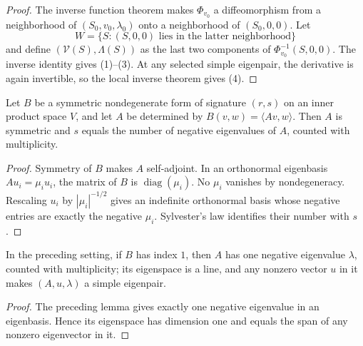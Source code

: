 \begin{proof}
\leanok
{}
\sketch The inverse function theorem makes $\Phi_{v_0}$ a diffeomorphism from a
neighborhood of $(S_0,v_0,\lambda_0)$ onto a neighborhood of $(S_0,0,0)$. Let
\[
W=\{S:(S,0,0)\text{ lies in the latter neighborhood}\}
\]
and define $(\mathcal V(S),\Lambda(S))$ as the last two components of
$\Phi_{v_0}^{-1}(S,0,0)$. The inverse identity gives (1)--(3). At any selected
simple eigenpair, the derivative is again invertible, so the local inverse theorem
gives (4).
\end{proof}

\begin{lemma}
\label{lem:signature-and-eigenvalue-signs}
\leanok
{}
Let $B$ be a symmetric nondegenerate form of signature $(r,s)$ on an inner product
space $V$, and let $A$ be determined by
$B(v,w)=\langle Av,w\rangle$. Then $A$ is symmetric and $s$ equals the number of
negative eigenvalues of $A$, counted with multiplicity.
\end{lemma}

\begin{proof}
\leanok
{}
\sketch Symmetry of $B$ makes $A$ self-adjoint. In an orthonormal eigenbasis
$Au_i=\mu_i u_i$, the matrix of $B$ is $\operatorname{diag}(\mu_i)$. No $\mu_i$
vanishes by nondegeneracy. Rescaling $u_i$ by $|\mu_i|^{-1/2}$ gives an
indefinite orthonormal basis whose negative entries are exactly the negative
$\mu_i$. Sylvester's law identifies their number with $s$.
\end{proof}

\begin{lemma}
\label{lem:simple-eigenpair-of-index-one}
\leanok
{}
In the preceding setting, if $B$ has index $1$, then $A$ has one negative
eigenvalue $\lambda$, counted with multiplicity; its eigenspace is a line, and
any nonzero vector $u$ in it makes $(A,u,\lambda)$ a simple eigenpair.
\end{lemma}

\begin{proof}
\leanok
{}
\sketch The preceding lemma gives exactly one negative eigenvalue in an eigenbasis.
Hence its eigenspace has dimension one and equals the span of any nonzero
eigenvector in it.
\end{proof}

